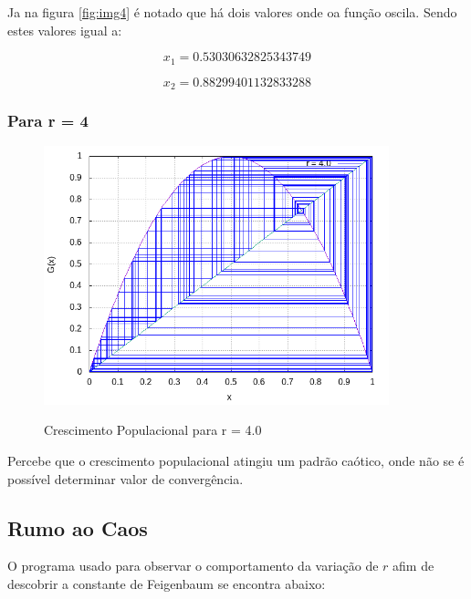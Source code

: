 \documentclass[a4paper, 12pt]{article}
\begin{document}
Ja na figura \ref{fig:img4} é notado que há dois valores onde oa função oscila. Sendo estes valores igual a:

\begin{equation*}
	x_1 =  0.53030632825343749	
\end{equation*}

\begin{equation*}
 x_2 = 0.88299401132833288
\end{equation*}

\hspace{0.5cm}


\subsubsection{Para r = 4}

\begin{figure}[H]
	\centering
	\caption{Crescimento Populacional para r = 4.0}{}
	\includegraphics[width=10.0cm]{r=4.png}
	\label{fig:img5}
\end{figure}


Percebe que o crescimento populacional atingiu um padrão caótico, onde não se é possível determinar valor de convergência.



\subsection{Rumo ao Caos}

O programa usado para observar o comportamento da variação de $r$ afim de descobrir a constante de Feigenbaum se encontra abaixo: 
\end{document}

